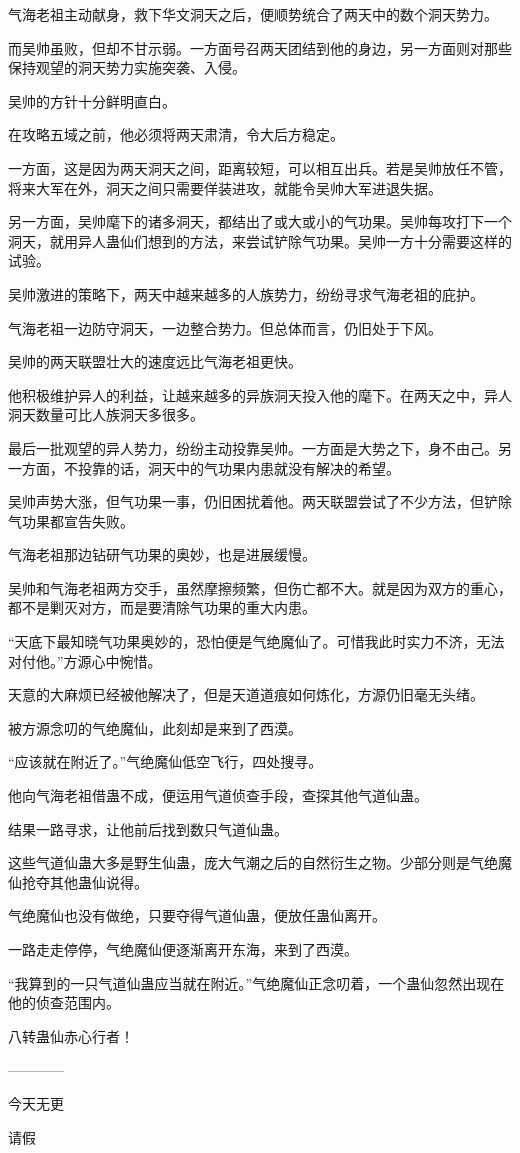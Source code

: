 \begin{this_body}
气海老祖主动献身，救下华文洞天之后，便顺势统合了两天中的数个洞天势力。

而吴帅虽败，但却不甘示弱。一方面号召两天团结到他的身边，另一方面则对那些保持观望的洞天势力实施突袭、入侵。

吴帅的方针十分鲜明直白。

在攻略五域之前，他必须将两天肃清，令大后方稳定。

一方面，这是因为两天洞天之间，距离较短，可以相互出兵。若是吴帅放任不管，将来大军在外，洞天之间只需要佯装进攻，就能令吴帅大军进退失据。

另一方面，吴帅麾下的诸多洞天，都结出了或大或小的气功果。吴帅每攻打下一个洞天，就用异人蛊仙们想到的方法，来尝试铲除气功果。吴帅一方十分需要这样的试验。

吴帅激进的策略下，两天中越来越多的人族势力，纷纷寻求气海老祖的庇护。

气海老祖一边防守洞天，一边整合势力。但总体而言，仍旧处于下风。

吴帅的两天联盟壮大的速度远比气海老祖更快。

他积极维护异人的利益，让越来越多的异族洞天投入他的麾下。在两天之中，异人洞天数量可比人族洞天多很多。

最后一批观望的异人势力，纷纷主动投靠吴帅。一方面是大势之下，身不由己。另一方面，不投靠的话，洞天中的气功果内患就没有解决的希望。

吴帅声势大涨，但气功果一事，仍旧困扰着他。两天联盟尝试了不少方法，但铲除气功果都宣告失败。

气海老祖那边钻研气功果的奥妙，也是进展缓慢。

吴帅和气海老祖两方交手，虽然摩擦频繁，但伤亡都不大。就是因为双方的重心，都不是剿灭对方，而是要清除气功果的重大内患。

“天底下最知晓气功果奥妙的，恐怕便是气绝魔仙了。可惜我此时实力不济，无法对付他。”方源心中惋惜。

天意的大麻烦已经被他解决了，但是天道道痕如何炼化，方源仍旧毫无头绪。

被方源念叨的气绝魔仙，此刻却是来到了西漠。

“应该就在附近了。”气绝魔仙低空飞行，四处搜寻。

他向气海老祖借蛊不成，便运用气道侦查手段，查探其他气道仙蛊。

结果一路寻求，让他前后找到数只气道仙蛊。

这些气道仙蛊大多是野生仙蛊，庞大气潮之后的自然衍生之物。少部分则是气绝魔仙抢夺其他蛊仙说得。

气绝魔仙也没有做绝，只要夺得气道仙蛊，便放任蛊仙离开。

一路走走停停，气绝魔仙便逐渐离开东海，来到了西漠。

“我算到的一只气道仙蛊应当就在附近。”气绝魔仙正念叨着，一个蛊仙忽然出现在他的侦查范围内。

八转蛊仙赤心行者！

------------

今天无更

请假

\end{this_body}

